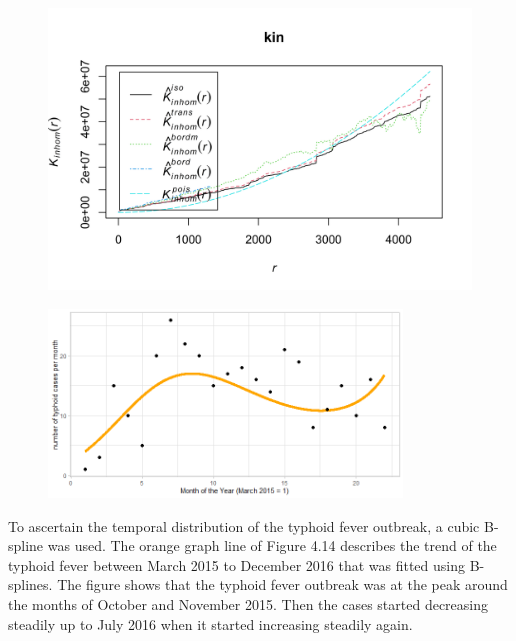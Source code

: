 \documentclass[12pt,a4paper]{report}
\begin{document}
\begin{figure}[H]
	\begin{center}
		\includegraphics[width=\linewidth]{Inhomogeneous K Function - All Cases.png}
	\end{center}
\end{figure}

\begin{figure}[H]
\begin{center}
\includegraphics[width=\linewidth, height = 50mm]{Long term trend of temporal model - All Cases.png}
\end{center}
\end{figure}

To ascertain the temporal distribution of the typhoid fever outbreak, a cubic B-spline was used. The orange graph line of Figure 4.14 describes the trend of the typhoid fever between March 2015 to December 2016 that was fitted using B-splines. The figure shows that the typhoid fever outbreak was at the peak around the months of October and November 2015. Then the cases started decreasing steadily up to July 2016 when it started increasing steadily again. 
\end{document}
